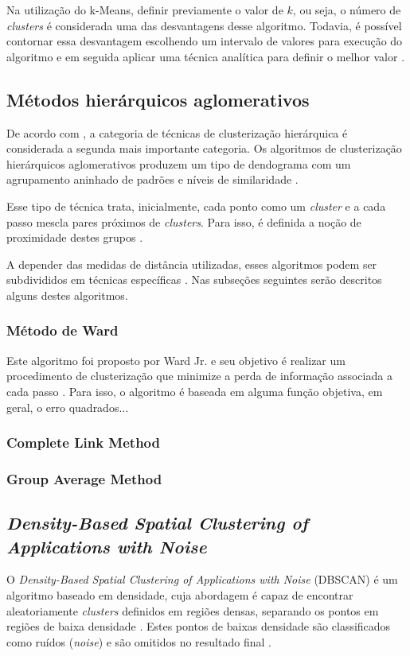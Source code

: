 Na utilização do k-Means, definir previamente o valor de $k$, ou seja, o número de \textit{clusters} é considerada uma das desvantagens desse algoritmo. Todavia,
é possível contornar essa desvantagem escolhendo um intervalo de valores para execução do algoritmo e em seguida aplicar
uma técnica analítica para definir o melhor valor \cite{han2011data}.


\subsection{Métodos hierárquicos aglomerativos}

De acordo com , a categoria de técnicas de clusterização hierárquica é considerada a segunda mais 
importante categoria. Os algoritmos de clusterização hierárquicos aglomerativos produzem um tipo de dendograma 
com um agrupamento aninhado de padrões e níveis de similaridade \cite{han2011data, tan2013data}.  

Esse tipo de técnica trata, inicialmente, cada ponto como um \textit{cluster} e a cada passo mescla pares próximos de \textit{clusters}.
Para isso, é definida a noção de proximidade destes grupos \cite{tan2013data}.

A depender das medidas de distância utilizadas, esses algoritmos podem ser subdivididos em técnicas específicas \cite{gan2007data}. 
Nas subseções seguintes serão descritos alguns destes algoritmos.

\subsubsection*{Método de Ward}

Este algoritmo foi proposto por Ward Jr. e seu objetivo é realizar um procedimento de clusterização que minimize a perda 
de informação associada a cada passo \cite{gan2007data}. Para isso, o algoritmo é baseada em alguma função objetiva, em geral, 
o erro quadrados...


\subsubsection*{Complete Link Method}

\subsubsection*{Group Average Method}


\subsection{\textit{Density-Based Spatial Clustering of Applications with Noise}}
O \textit{Density-Based Spatial Clustering of Applications with Noise} (DBSCAN) é um algoritmo baseado em densidade, 
cuja abordagem é capaz de encontrar aleatoriamente \textit{clusters} definidos em regiões densas, separando os pontos
em regiões de baixa densidade \cite{gan2007data}. Estes pontos de baixas densidade são classificados como ruídos (\textit{noise})
e são omitidos no resultado final \cite{gan2007data, tan2013data}.

